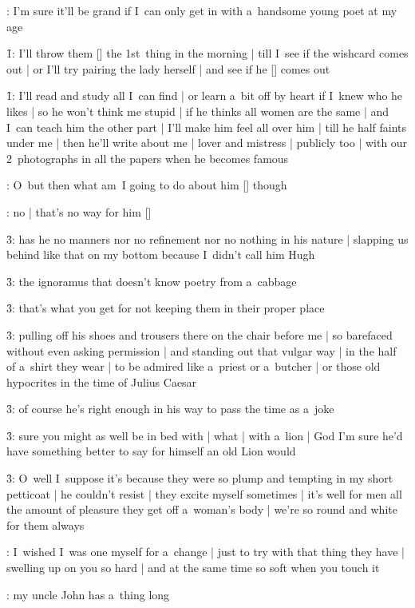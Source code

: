 :
I'm sure it'll be grand if I~can only get in with a~handsome young poet at my age

\f1:
I'll throw them [\cards] the 1st~thing in the morning |
till I~see if the wishcard comes out |
or I'll try pairing the lady herself |
and see if he [\stephen] comes out

\f1:
I'll read and study all I~can find |
or learn a~bit off by heart if I~knew who he likes |
so he won't think me stupid |
if he thinks all women are the same |
and I~can teach him the other part |
I'll make him feel all over him |
till he half faints under me |
then he'll write about me |
lover and mistress |
publicly too |
with our 2~photographs in all the papers when he becomes famous

:
O~but then what am~I going to do about him [\boylan] though




:
no |
that's no way for him [\boylan]

\f3:
has he no manners nor no refinement nor no nothing in his nature |
slapping us behind like that on my bottom because I~didn't call him Hugh

\f3:
the ignoramus that doesn't know poetry from a~cabbage

\f3:
that's what you get for not keeping them in their proper place

\f3:
pulling off his shoes and trousers there on the chair before me |
so barefaced without even asking permission |
and standing out that vulgar way |
in the half of a~shirt they wear |
to be admired like a~priest or a~butcher |
or those old hypocrites in the time of Julius Caesar

\f3:
of course he's right enough in his way to pass the time as a~joke

\f3:
sure you might as well be in bed with |
what |
with a~lion |
God I'm sure he'd have something better to say for himself an old Lion would

\f3:
O~well I~suppose it's because they were so plump and tempting in my short petticoat |
he couldn't resist |
they excite myself sometimes |
it's well for men all the amount of pleasure they get off a~woman's body |
we're so round and white for them always

:
I~wished I~was one myself for a~change |
just to try with that thing they have |
swelling up on you so hard |
and at the same time so soft when you touch it

:
my uncle John has a~thing long

